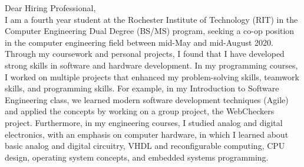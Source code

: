 \documentclass[line,margin]{res}
\begin{document}
\setlength\columnsep{-30pt}
\email{} %
\phone{} %
\address{} %
\address{} %
\website{} %

\begin{resume}
 \setlength
 \multicolsep{2pt}
 \begin{adjustwidth}{-92pt}{0pt}
 \vspace{10pt}

\noindent
Dear Hiring Professional, \\

\noindent
I am a fourth year student at the Rochester Institute of Technology (RIT) in the Computer Engineering Dual Degree (BS/MS) program, seeking a co-op position in the computer engineering field between mid-May and mid-August 2020. \\

\noindent
Through my coursework and personal projects, I found that I have developed strong skills in software and hardware development. In my programming courses, I worked on multiple projects that enhanced my problem-solving skills, teamwork skills, and programming skills. For example, in my Introduction to Software Engineering class, we learned modern software development techniques (Agile) and applied the concepts by working on a group project, the WebCheckers project. Furthermore, in my engineering courses, I studied analog and digital electronics, with an emphasis on computer hardware, in which I learned about basic analog and digital circuitry, VHDL and reconfigurable computing, CPU design, operating system concepts, and embedded systems programming. \\


\end{adjustwidth}
\end{resume}
\end{document}
